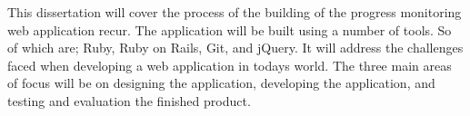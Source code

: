 This dissertation will cover the process of the building of the progress monitoring web application recur. The application will be built using a number of tools. So of which are; Ruby, Ruby on Rails, Git, and jQuery. It will address the challenges faced when developing a web application in todays world. The three main areas of focus will be on designing the application, developing the application, and testing and evaluation the finished product.\\